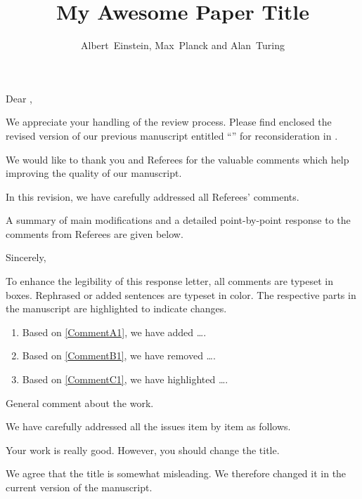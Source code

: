 \documentclass[12pt,english]{reviewresponse}
\title{My Awesome Paper Title}
\author{Albert~Einstein, Max~Planck and Alan~Turing}
\begin{document}
\maketitle

Dear \theeditor,

We appreciate your handling of the review process. Please find enclosed the revised version of our previous manuscript {\themanuscript} {\thefirstauthor} entitled \enquote{\thetitle} for reconsideration in \thejournal.

We would like to thank you and Referees for the valuable comments which help improving the quality of our manuscript.

In this revision, we have carefully addressed all Referees' comments.

A summary of main modifications and a detailed point-by-point response to the comments from Referees are given below.

Sincerely,

\theauthor

\vfil


\thispagestyle{empty}
\setcounter{page}{0}


\change


To enhance the legibility of this response letter, all comments are typeset in boxes. Rephrased or added sentences are typeset in color. The respective parts in the manuscript are highlighted to indicate changes.
\begin{changes}
\begin{enumerate}[leftmargin=0.3cm]
	\item Based on \autoref{CommentA1}, we have added \dots.
	\item Based on \autoref{CommentB1}, we have removed \dots.
	\item Based on \autoref{CommentC1}, we have 
	highlighted \dots.
\end{enumerate}
\end{changes}


\label{RefereeA}

\begin{generalcomment}
	General comment about the work.
\end{generalcomment}
\begin{generalresponse}
	We have carefully addressed all the issues item by item as follows.
\end{generalresponse}

\begin{revcomment}\label{CommentA1}
	Your work is really good. However, you should change the title.
\end{revcomment}
\begin{revresponse}\label{ResponseA1}
	We agree that the title is somewhat misleading.
	We therefore changed it in the current version of the manuscript.
\end{revresponse}
\end{document}
